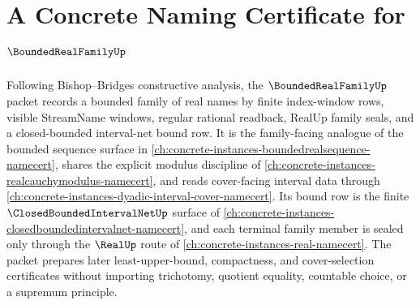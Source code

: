 \chapter{A Concrete Naming Certificate for $\BoundedRealFamilyUp$}
\label{ch:concrete-instances-boundedrealfamily-namecert}

Following Bishop--Bridges constructive analysis, the $\BoundedRealFamilyUp$ packet records a bounded family of real names by finite index-window rows, visible StreamName windows, regular rational readback, RealUp family seals, and a closed-bounded interval-net bound row. It is the family-facing analogue of the bounded sequence surface in \autoref{ch:concrete-instances-boundedrealsequence-namecert}, shares the explicit modulus discipline of \autoref{ch:concrete-instances-realcauchymodulus-namecert}, and reads cover-facing interval data through \autoref{ch:concrete-instances-dyadic-interval-cover-namecert}. Its bound row is the finite $\ClosedBoundedIntervalNetUp$ surface of \autoref{ch:concrete-instances-closedboundedintervalnet-namecert}, and each terminal family member is sealed only through the $\RealUp$ route of \autoref{ch:concrete-instances-real-namecert}. The packet prepares later least-upper-bound, compactness, and cover-selection certificates without importing trichotomy, quotient equality, countable choice, or a supremum principle.

